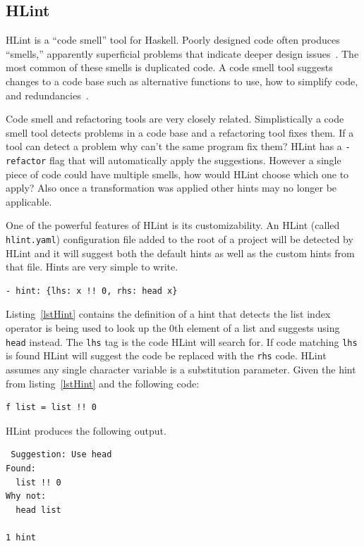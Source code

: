 \subsection{HLint}

HLint is a ``code smell'' tool for Haskell. Poorly designed code often produces ``smells,'' apparently superficial problems that indicate deeper design issues~\citep{fowler}. The most common of these smells is duplicated code. A code smell tool  suggests changes to a code base such as alternative functions to use, how to simplify code, and redundancies~\citep{hlint}.

Code smell and refactoring tools are very closely related. Simplistically a code smell tool detects problems in a code base and a refactoring tool fixes them. If a tool can detect a problem why can't the same program fix them? HLint has a \texttt{-refactor} flag that will automatically apply the suggestions. However a single piece of code could have multiple smells, how would HLint choose which one to apply? Also once a transformation was applied other hints may no longer be applicable.

One of the powerful features of HLint is its customizability. An HLint (called \texttt{hlint.yaml}) configuration file added to the root of a project   will be detected by HLint and it will suggest both the default hints as well as the custom hints from that file. Hints are very simple to write.

\begin{lstlisting}[caption={A simple hint from~\citep{hlint}}, label=lstHint]
- hint: {lhs: x !! 0, rhs: head x}
\end{lstlisting}

Listing~\ref{lstHint} contains the definition of a hint that detects the list index operator is being used to look up the 0th element of a list and suggests using \texttt{head} instead. The \texttt{lhs} tag is the code HLint will search for. If code matching \texttt{lhs} is found  HLint will suggest the code be replaced with the \texttt{rhs} code. HLint assumes any single character variable is a substitution parameter. Given the hint from listing~\ref{lstHint} and the following code:

\begin{lstlisting}
f list = list !! 0
\end{lstlisting}

HLint produces the following output.

\begin{lstlisting}
 Suggestion: Use head
Found:
  list !! 0
Why not:
  head list

1 hint
\end{lstlisting}


